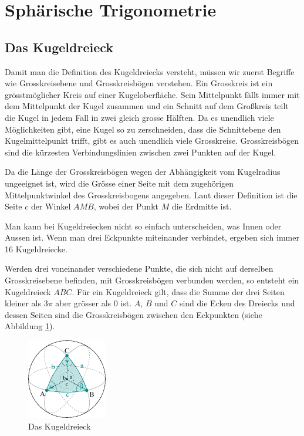 
\section{Sphärische Trigonometrie}

\subsection{Das Kugeldreieck}
Damit man die Definition des Kugeldreiecks versteht, müssen wir zuerst Begriffe wie Grosskreisebene und Grosskreisbögen verstehen.
%
%
%
Ein Grosskreis ist ein grösstmöglicher Kreis auf einer Kugel\-ober\-fläche.
Sein Mittelpunkt fällt immer mit dem Mittelpunkt der Kugel zusammen
und ein Schnitt auf dem Großkreis teilt die Kugel in jedem Fall in
zwei gleich grosse Hälften.
Da es unendlich viele Möglichkeiten gibt, eine Kugel so zu zerschneiden, dass die Schnittebene den Kugelmittelpunkt trifft, gibt es auch unendlich viele Grosskreise.
Grosskreisbögen sind die kürzesten Verbindungslinien zwischen zwei Punkten auf der Kugel.

Da die Länge der Grosskreisbögen wegen der Abhängigkeit vom Kugelradius ungeeignet ist, wird die Grösse einer Seite mit dem zugehörigen Mittelpunktwinkel des Grosskreisbogens angegeben. 
Laut dieser Definition ist die Seite $c$ der Winkel $AMB$, wobei der Punkt $M$ die Erdmitte ist.

Man kann bei Kugeldreiecken nicht so einfach unterscheiden, was Innen oder Aussen ist. 
Wenn man drei Eckpunkte miteinander verbindet, ergeben sich immer 16 Kugeldreiecke. 

Werden drei voneinander verschiedene Punkte, die sich nicht auf
derselben Grosskreisebene befinden, mit Grosskreisbögen verbunden
werden, so entsteht ein Kugeldreieck $ABC$.
Für ein Kugel\-drei\-eck gilt, dass die Summe der drei Seiten kleiner
als $3\pi$ aber grösser als 0 ist.
$A$, $B$ und $C$ sind die Ecken des Dreiecks und dessen Seiten sind die Grosskreisbögen zwischen den Eckpunkten (siehe Abbildung \ref{kugel}). 

\begin{figure}
	\begin{center}
		\includegraphics[width=3.5cm]{papers/nav/bilder/kugel1.png}
		\caption[Das Kugeldreieck]{Das Kugeldreieck}
		\label{kugel}
	\end{center}
	
\end{figure}

